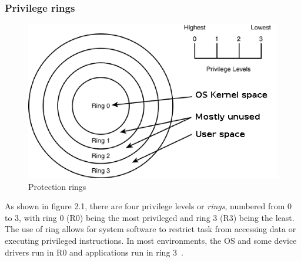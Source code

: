 \documentclass[a4paper, 12pt, titlepage]{report}
\begin{document}
\subsubsection{Privilege rings}
\begin{figure}[!h]
	\centering
	\includegraphics[scale=0.5]{img/rings.png}
	\caption{Protection rings}
\end{figure}
As shown in figure 2.1, there are four privilege levels or \textit{rings}, numbered from 0 to 3, with ring 0 (R0) being the most privileged and ring 3 (R3) being the least. The use of ring allows for system software to restrict task from accessing data or executing privileged instructions. In most environments, the OS and some device drivers run in R0 and applications run in ring 3~\cite{rings}.
\end{document}
